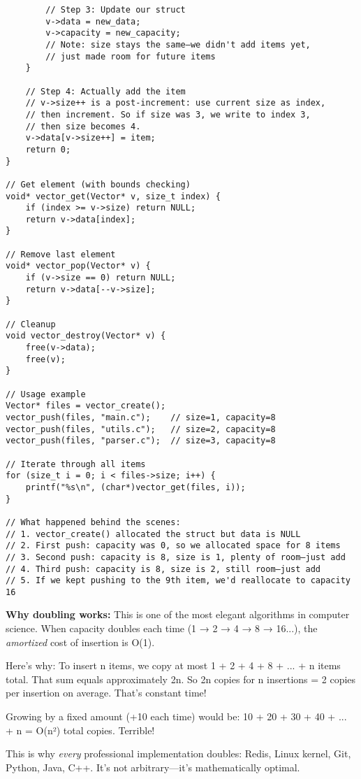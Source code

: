 \begin{lstlisting}
        // Step 3: Update our struct
        v->data = new_data;
        v->capacity = new_capacity;
        // Note: size stays the same—we didn't add items yet,
        // just made room for future items
    }

    // Step 4: Actually add the item
    // v->size++ is a post-increment: use current size as index,
    // then increment. So if size was 3, we write to index 3,
    // then size becomes 4.
    v->data[v->size++] = item;
    return 0;
}

// Get element (with bounds checking)
void* vector_get(Vector* v, size_t index) {
    if (index >= v->size) return NULL;
    return v->data[index];
}

// Remove last element
void* vector_pop(Vector* v) {
    if (v->size == 0) return NULL;
    return v->data[--v->size];
}

// Cleanup
void vector_destroy(Vector* v) {
    free(v->data);
    free(v);
}

// Usage example
Vector* files = vector_create();
vector_push(files, "main.c");    // size=1, capacity=8
vector_push(files, "utils.c");   // size=2, capacity=8
vector_push(files, "parser.c");  // size=3, capacity=8

// Iterate through all items
for (size_t i = 0; i < files->size; i++) {
    printf("%s\n", (char*)vector_get(files, i));
}

// What happened behind the scenes:
// 1. vector_create() allocated the struct but data is NULL
// 2. First push: capacity was 0, so we allocated space for 8 items
// 3. Second push: capacity is 8, size is 1, plenty of room—just add
// 4. Third push: capacity is 8, size is 2, still room—just add
// 5. If we kept pushing to the 9th item, we'd reallocate to capacity 16
\end{lstlisting}

\begin{tipbox}
\textbf{Why doubling works:} This is one of the most elegant algorithms in computer science. When capacity doubles each time (1 → 2 → 4 → 8 → 16...), the \textit{amortized} cost of insertion is O(1).

Here's why: To insert n items, we copy at most 1 + 2 + 4 + 8 + ... + n items total. That sum equals approximately 2n. So 2n copies for n insertions = 2 copies per insertion on average. That's constant time!

Growing by a fixed amount (+10 each time) would be: 10 + 20 + 30 + 40 + ... + n = O(n²) total copies. Terrible!

This is why \textit{every} professional implementation doubles: Redis, Linux kernel, Git, Python, Java, C++. It's not arbitrary—it's mathematically optimal.
\end{tipbox}

